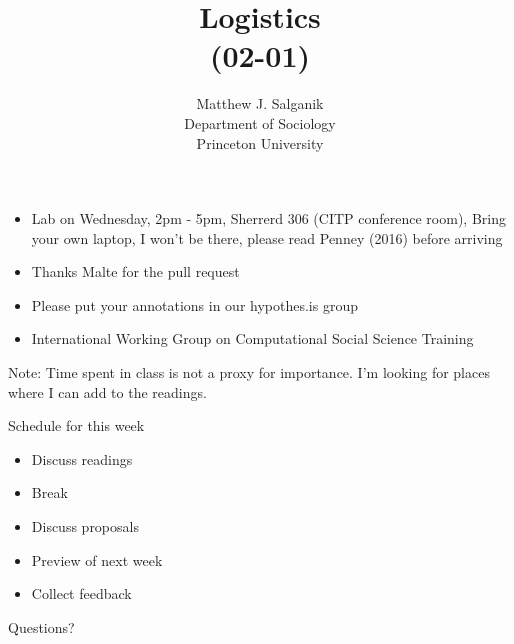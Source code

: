 \documentclass[aspectratio=169]{beamer}
\title[]{Logistics\\(02-01)}
\author[]{Matthew J. Salganik\\Department of Sociology\\Princeton University}
\date[]{Soc 596: Computational Social Science\\Fall 2016
\vfill
\begin{flushright}
\vspace{0.6in}
\texttt{[image: figures/cc.png]}
\end{flushright}
}
\def\vf{\vfill}
\begin{document}
\frame{\titlepage}
\begin{frame}

\begin{itemize}
\item Lab on Wednesday, 2pm - 5pm, Sherrerd 306 (CITP conference room), Bring your own laptop, I won't be there, please read Penney (2016) before arriving
\pause
\item Thanks Malte for the pull request
\pause
\item Please put your annotations in our hypothes.is group
\pause
\item International Working Group on Computational Social Science Training
\end{itemize}

\end{frame}
\begin{frame}

Note: Time spent in class is not a proxy for importance. I'm looking for places where I can add to the readings.

\end{frame}
\begin{frame}

Schedule for this week
\begin{itemize}
\item Discuss readings
\item Break
\item Discuss proposals
\item Preview of next week
\item Collect feedback
\end{itemize}

\vf
Questions?

\end{frame}
\end{document}
